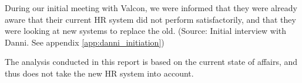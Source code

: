 During our initial meeting with Valcon, we were informed that they were already aware that their current HR system did not perform satisfactorily, and that they were looking at new systems to replace the old. (Source: Initial interview with Danni. See appendix \ref{app:danni_initiation})

The analysis conducted in this report is based on the current state of affairs, and thus does not take the new HR system into account.
